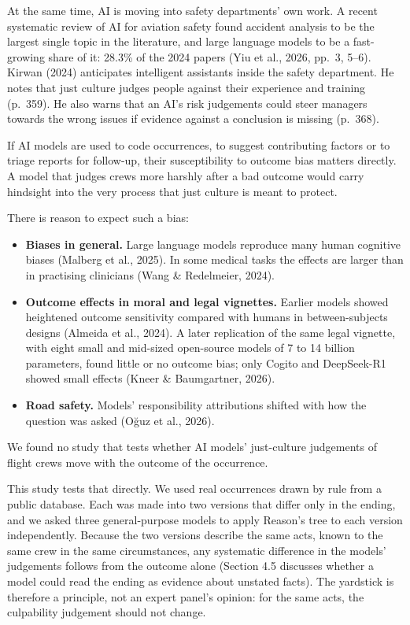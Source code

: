 \documentclass[11pt]{article}
\providecommand{\tightlist}{\setlength{\itemsep}{0pt}\setlength{\parskip}{0pt}}
\begin{document}
At the same time, AI is moving into safety departments' own work. A recent systematic review of AI for aviation safety found accident analysis to be the largest single topic in the literature, and large language models to be a fast-growing share of it: 28.3\% of the 2024 papers (Yiu et al., 2026, pp.~3, 5--6). Kirwan (2024) anticipates intelligent assistants inside the safety department. He notes that just culture judges people against their experience and training (p.~359). He also warns that an AI's risk judgements could steer managers towards the wrong issues if evidence against a conclusion is missing (p.~368).

If AI models are used to code occurrences, to suggest contributing factors or to triage reports for follow-up, their susceptibility to outcome bias matters directly. A model that judges crews more harshly after a bad outcome would carry hindsight into the very process that just culture is meant to protect.

There is reason to expect such a bias:

\begin{itemize}
\tightlist
\item
  \textbf{Biases in general.} Large language models reproduce many human cognitive biases (Malberg et al., 2025). In some medical tasks the effects are larger than in practising clinicians (Wang \& Redelmeier, 2024).
\item
  \textbf{Outcome effects in moral and legal vignettes.} Earlier models showed heightened outcome sensitivity compared with humans in between-subjects designs (Almeida et al., 2024). A later replication of the same legal vignette, with eight small and mid-sized open-source models of 7 to 14 billion parameters, found little or no outcome bias; only Cogito and DeepSeek-R1 showed small effects (Kneer \& Baumgartner, 2026).
\item
  \textbf{Road safety.} Models' responsibility attributions shifted with how the question was asked (Oğuz et al., 2026).
\end{itemize}

We found no study that tests whether AI models' just-culture judgements of flight crews move with the outcome of the occurrence.

This study tests that directly. We used real occurrences drawn by rule from a public database. Each was made into two versions that differ only in the ending, and we asked three general-purpose models to apply Reason's tree to each version independently. Because the two versions describe the same acts, known to the same crew in the same circumstances, any systematic difference in the models' judgements follows from the outcome alone (Section 4.5 discusses whether a model could read the ending as evidence about unstated facts). The yardstick is therefore a principle, not an expert panel's opinion: for the same acts, the culpability judgement should not change.
\end{document}
